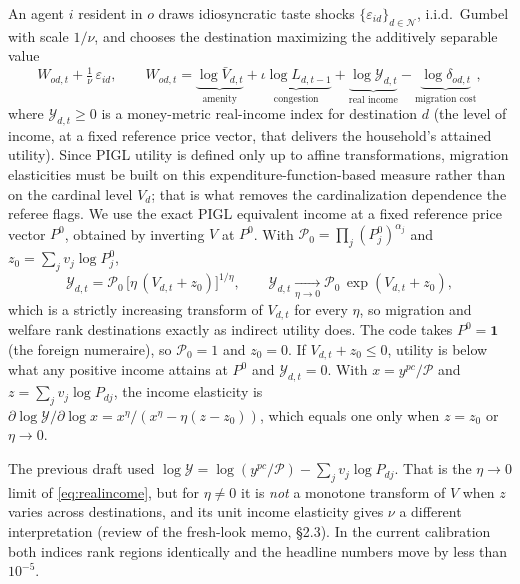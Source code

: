 \documentclass[11pt]{article}
\newcommand{\Nreg}{\mathcal{N}}
\begin{document}
An agent $i$ resident in $o$ draws idiosyncratic taste shocks $\{\varepsilon_{id}\}_{d\in\Nreg}$,
i.i.d.\ Gumbel with scale $1/\nu$, and chooses the destination maximizing the additively
separable value
\begin{equation}
  W_{od,t} + \tfrac{1}{\nu}\,\varepsilon_{id},
  \qquad
  W_{od,t}
  = \underbrace{\log \bar V_{d,t}}_{\text{amenity}}
  + \underbrace{\iota \log L_{d,t-1}}_{\text{congestion}}
  + \underbrace{\log \mathcal{Y}_{d,t}}_{\text{real income}}
  - \underbrace{\log \delta_{od,t}}_{\text{migration cost}} ,
  \label{eq:Wod}
\end{equation}
where $\mathcal{Y}_{d,t}\ge 0$ is a money-metric real-income index for destination $d$ (the
level of income, at a fixed reference price vector, that delivers the household's
attained utility). Since PIGL utility is defined only up to affine transformations,
migration elasticities must be built on this expenditure-function-based measure rather
than on the cardinal level $V_d$; that is what removes the cardinalization dependence the
referee flags. We use the exact PIGL equivalent income at a fixed reference price vector
$P^0$, obtained by inverting $V$ at $P^0$. With $\mathcal{P}_0=\prod_j (P^0_j)^{\alpha_j}$ and
$z_0=\sum_j v_j\log P^0_j$,
\begin{equation}
  \mathcal{Y}_{d,t}
  = \mathcal{P}_0\,\bigl[\eta\,(V_{d,t}+z_0)\bigr]^{1/\eta},
  \qquad
  \mathcal{Y}_{d,t}\xrightarrow[\eta\to 0]{}\mathcal{P}_0\,\exp(V_{d,t}+z_0),
  \label{eq:realincome}
\end{equation}
which is a strictly increasing transform of $V_{d,t}$ for every $\eta$, so migration and
welfare rank destinations exactly as indirect utility does. The code takes $P^0=\mathbf 1$
(the foreign numeraire), so $\mathcal{P}_0=1$ and $z_0=0$. If $V_{d,t}+z_0\le 0$, utility is
below what any positive income attains at $P^0$ and $\mathcal{Y}_{d,t}=0$. With
$x=y^{pc}/\mathcal{P}$ and $z=\sum_j v_j\log P_{dj}$, the income elasticity is
$\partial\log\mathcal{Y}/\partial\log x = x^{\eta}/(x^{\eta}-\eta(z-z_0))$, which equals one
only when $z=z_0$ or $\eta\to0$.

The previous draft used $\log\mathcal{Y}=\log(y^{pc}/\mathcal{P})-\sum_j v_j\log P_{dj}$. That
is the $\eta\to0$ limit of \eqref{eq:realincome}, but for $\eta\ne0$ it is \emph{not} a
monotone transform of $V$ when $z$ varies across destinations, and its unit income
elasticity gives $\nu$ a different interpretation (review of the fresh-look memo, \S2.3). In
the current calibration both indices rank regions identically and the headline numbers move by
less than $10^{-5}$.
\end{document}
